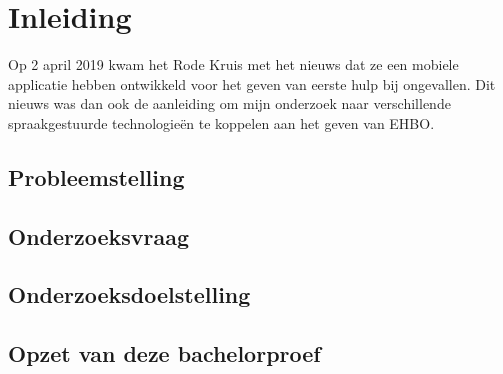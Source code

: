 
\chapter{Inleiding}
\label{ch:inleiding}
Op 2 april 2019 kwam het Rode Kruis met het nieuws dat ze een mobiele applicatie hebben ontwikkeld voor het geven van eerste hulp bij ongevallen. Dit nieuws was dan ook de aanleiding om mijn onderzoek naar verschillende spraakgestuurde technologieën te koppelen aan het geven van EHBO. 

\section{Probleemstelling}
\label{sec:probleemstelling}

\section{Onderzoeksvraag}
\label{sec:onderzoeksvraag} 

\section{Onderzoeksdoelstelling}
\label{sec:onderzoeksdoelstelling}

\section{Opzet van deze bachelorproef}
\label{sec:opzet-bachelorproef}


